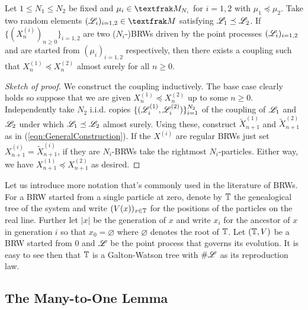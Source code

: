 \begin{lemma}\label{lem:monotonicity}
Let $1 \leq N_1 \leq N_2$ be fixed and $\mu_i \in \frak{M}_{N_i}$ for $i=1,2$ with $\mu_1 \preceq \mu_2$. Take two random elements $(\scr{L}_i)_{i =1,2} \in \frak{M}$ satisfying $\mathscr{L}_1 \preceq \mathscr{L}_2$. If $\{(X^{(i)}_n)_{n\geq0}\}_{i=1,2}$ are two ($N_i$-)BRWs driven by the point processes $(\mathscr{L}_i)_{i = 1,2}$ and are started from $(\mu_i)_{i = 1,2}$ respectively, then there exists a coupling such that $X^{(1)}_n \preceq X^{(2)}_n$ almost surely for all $n \geq 0$. 
\end{lemma}

\begin{proof}[Sketch of proof]
We construct the coupling inductively. The base case clearly holds so suppose that we are given $X^{(1)}_n \preceq X^{(2)}_n$ up to some $n \geq 0$. Independently take $N_2$ i.i.d. copies $\{(\mathscr{L}^{(1)}_i, \mathscr{L}^{(2)}_i)\}^{N_2}_{i=1}$ of the coupling of $\mathscr{L}_1$ and $\mathscr{L}_2$ under which $\mathscr{L}_1 \preceq \mathscr{L}_2$ almost surely. Using these, construct $\widetilde{X}^{(1)}_{n+1}$ and $\widetilde{X}^{(2)}_{n+1}$ as in (\ref{eqn:GeneralConstruction}). If the $X^{(i)}$ are regular BRWs just set $X^{(i)}_{n+1} = \widetilde{X}^{(i)}_{n+1}$, if they are $N_i$-BRWs take the rightmost $N_i$-particles. Either way, we have $X^{(1)}_{n+1} \preceq X^{(2)}_{n+1}$ as desired. 
\end{proof}	


Let us introduce more notation that's commonly used in the literature of BRWs. For a BRW started from a single particle at zero, denote by $\mathbb{T}$ the genealogical tree of the system and write $(V(x))_{x \in \mathbb{T}}$ for the positions of the particles on the real line. Further let $|x|$ be the generation of $x$ and write $x_i$ for the ancestor of $x$ in generation $i$ so that $x_0 = \varnothing$ where $\varnothing$ denotes the root of $\mathbb{T}$. Let $(\mathbb{T}, V)$ be a BRW started from $0$ and $\mathscr{L}$ be the point process that governs its evolution. It is easy to see then that $\mathbb{T}$ is a Galton-Watson tree with $\# \mathscr{L}$ as its reproduction law. 

\subsection{The Many-to-One Lemma}

